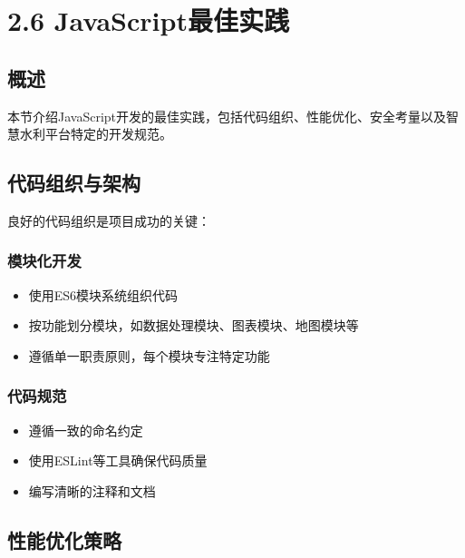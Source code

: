 \section{2.6
JavaScript最佳实践}\label{javascriptux6700ux4f73ux5b9eux8df5}

\subsection{概述}\label{ux6982ux8ff0}

本节介绍JavaScript开发的最佳实践，包括代码组织、性能优化、安全考量以及智慧水利平台特定的开发规范。

\subsection{代码组织与架构}\label{ux4ee3ux7801ux7ec4ux7ec7ux4e0eux67b6ux6784}

良好的代码组织是项目成功的关键：

\subsubsection{模块化开发}\label{ux6a21ux5757ux5316ux5f00ux53d1}

\begin{itemize}
\tightlist
\item
  使用ES6模块系统组织代码
\item
  按功能划分模块，如数据处理模块、图表模块、地图模块等
\item
  遵循单一职责原则，每个模块专注特定功能
\end{itemize}

\subsubsection{代码规范}\label{ux4ee3ux7801ux89c4ux8303}

\begin{itemize}
\tightlist
\item
  遵循一致的命名约定
\item
  使用ESLint等工具确保代码质量
\item
  编写清晰的注释和文档
\end{itemize}

\subsection{性能优化策略}\label{ux6027ux80fdux4f18ux5316ux7b56ux7565}

